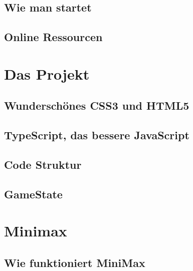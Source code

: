 \documentclass[12pt, draft]{beamer}
\begin{document}
\subsection{Wie man startet} \begin{frame}\end{frame}
\subsection{Online Ressourcen} \begin{frame}\end{frame} %

\section{Das Projekt}
\subsection{Wunderschönes CSS3 und HTML5} \begin{frame}\end{frame}
\subsection{TypeScript, das bessere JavaScript} \begin{frame}\end{frame}
\subsection{Code Struktur} \begin{frame}\end{frame}
\subsection{GameState} \begin{frame}\end{frame}

\section{Minimax}
\subsection{Wie funktioniert MiniMax} \begin{frame}\end{frame}
\end{document}

